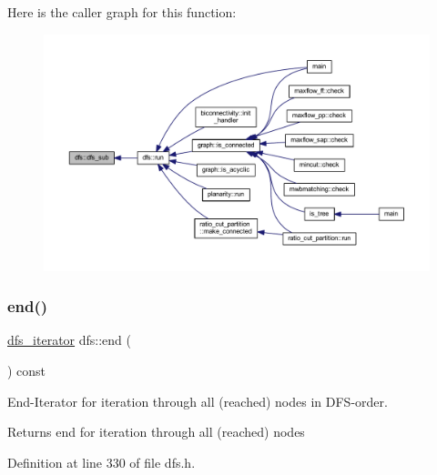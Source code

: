 Here is the caller graph for this function\+:\nopagebreak
\begin{figure}[H]
\begin{center}
\leavevmode
\includegraphics[width=350pt]{classdfs_ad10b710339b289a61723aef52fbcb5b4_icgraph}
\end{center}
\end{figure}
\mbox{\label{classdfs_af847633fa642258d3522e8deb26aef37}} 
\subsubsection{\texorpdfstring{end()}{end()}}
{\footnotesize\ttfamily \mbox{\hyperlink{classdfs_a15fe023a5a1f7ddda00f3d87110d9a32}{dfs\+\_\+iterator}} dfs\+::end (\begin{DoxyParamCaption}{ }\end{DoxyParamCaption}) const\hspace{0.3cm}{\ttfamily [inline]}}



End-\/\+Iterator for iteration through all (reached) nodes in D\+F\+S-\/order. 

\begin{DoxyReturn}{Returns}
end for iteration through all (reached) nodes 
\end{DoxyReturn}


Definition at line 330 of file dfs.\+h.


